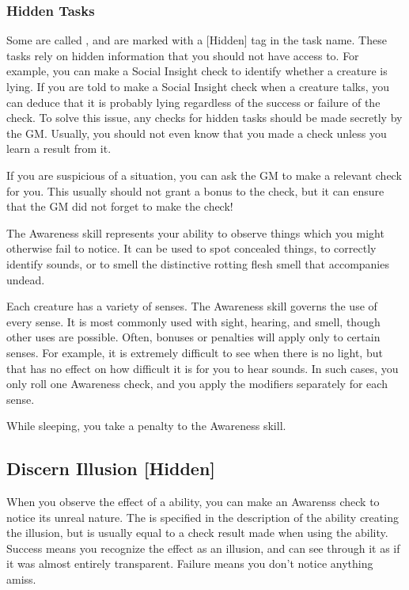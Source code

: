     \subsubsection{Hidden Tasks}\label{Hidden Tasks}
        Some  are called , and are marked with a [Hidden] tag in the task name.
        These tasks rely on hidden information that you should not have access to.
        For example, you can make a Social Insight check to identify whether a creature is lying.
        If you are told to make a Social Insight check when a creature talks, you can deduce that it is probably lying regardless of the success or failure of the check.
        To solve this issue, any checks for hidden tasks should be made secretly by the GM.\@
        Usually, you should not even know that you made a check unless you learn a result from it.

        If you are suspicious of a situation, you can ask the GM to make a relevant check for you.
        This usually should not grant a bonus to the check, but it can ensure that the GM did not forget to make the check!

\newpage
{}
    The Awareness skill represents your ability to observe things which you might otherwise fail to notice. It can be used to spot concealed things, to correctly identify sounds, or to smell the distinctive rotting flesh smell that accompanies undead.

    Each creature has a variety of senses. The Awareness skill governs the use of every sense. It is most commonly used with sight, hearing, and smell, though other uses are possible. Often, bonuses or penalties will apply only to certain senses. For example, it is extremely difficult to see when there is no light, but that has no effect on how difficult it is for you to hear sounds. In such cases, you only roll one Awareness check, and you apply the modifiers separately for each sense.

    While sleeping, you take a  penalty to the Awareness skill.

    \subsection{Discern Illusion [Hidden]}
        When you observe the effect of a  ability, you can make an Awarenss check to notice its unreal nature.
        The  is specified in the description of the ability creating the illusion, but is usually equal to a check result made when using the ability.
        Success means you recognize the effect as an illusion, and can see through it as if it was almost entirely transparent.
        Failure means you don't notice anything amiss.

